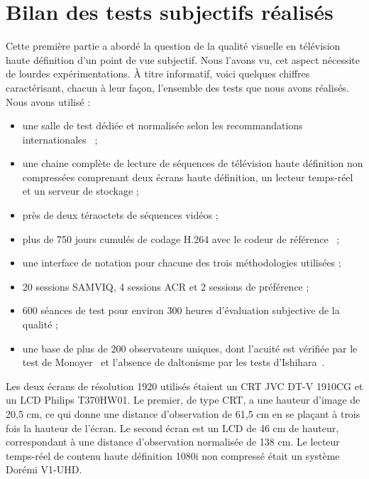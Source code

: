 \chapter*{Bilan des tests subjectifs réalisés}  %
Cette première partie a abordé la question de la qualité visuelle en télévision haute définition d'un point de vue subjectif. Nous l'avons vu, cet aspect nécessite de lourdes expérimentations. À titre informatif, voici quelques chiffres caractérisant, chacun à leur façon, l'ensemble des tests que nous avons réalisés. Nous avons utilisé :
\begin{itemize}
\item une salle de test dédiée et normalisée selon les recommandations internationales~\cite{itu-bt500-11,itu-bt710-4} ;
\item une chaine complète de lecture de séquences de télévision haute définition non compressées comprenant deux écrans haute définition, un lecteur temps-réel et un serveur de stockage ;
\item près de deux téraoctets de séquences vidéos ;
\item plus de 750 jours cumulés de codage H.264 avec le codeur de référence~\cite{h264-jm} ;
\item une interface de notation pour chacune des trois méthodologies utilisées ;
\item 20 sessions SAMVIQ, 4 sessions ACR et 2 sessions de préférence ;
\item 600 séances de test pour environ 300 heures d'évaluation subjective de la qualité ;
\item une base de plus de 200 observateurs uniques, dont l'acuité est vérifiée par le test de Monoyer~\cite{monoyer-plates} et l'absence de daltonisme par les tests d'Ishihara~\cite{ishihara-plates}.
\end{itemize}

Les deux écrans de résolution 1920 utilisés étaient un CRT JVC DT-V 1910CG et un LCD Philips T370HW01. Le premier, de type CRT, a une hauteur d'image de 20,5 cm, ce qui donne une distance d'observation de 61,5 cm en se plaçant à trois fois la hauteur de l'écran. Le second écran est un LCD de 46 cm de hauteur, correspondant à une distance d'observation normalisée de 138 cm. Le lecteur temps-réel de contenu haute définition 1080i non compressé était un système Dorémi V1-UHD.


